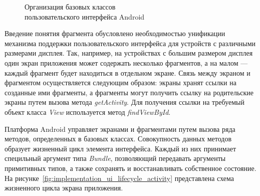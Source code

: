 \begin{figure}[h!]
  \centering
  \caption{Организация базовых классов \\ пользовательского интерфейса Android}
  \label{fig:implementation_ui_hierarchy}
\end{figure}

Введение понятия фрагмента обусловлено необходимостью унификации
механизма поддержки пользовательского интерфейса для устройств с различными
размерами дисплея. Так, например, на устройствах с большим размером дисплея
один экран приложения может содержать несколько фрагментов, а на малом ---
каждый фрагмент будет находиться в отдельном экране.
Связь между экраном и фрагментом осуществляется следующим образом:
экраны хранят ссылки на созданные ими фрагменты,
а фрагменты могут получить ссылку на родительские экраны путем
вызова метода \textit{getActivity}.
Для получения ссылки на требуемый объект класса \textit{View}
используется метод \textit{findViewById}.

Платформа Android управляет экранами и фрагментами путем вызова ряда методов,
определенных в базовых классах. Совокупность данных методов образует
жизненный цикл элемента интерфейса. Каждый из них принимает
специльный аргумент типа \textit{Bundle}, позволяющий передавать
аргументы примитивных типов, а также сохранять и восстанавливать
собственное состояние.
На рисунке~\ref{fig:implementation_ui_lifecycle_activity}
представлена схема жизненного цикла экрана приложения.

